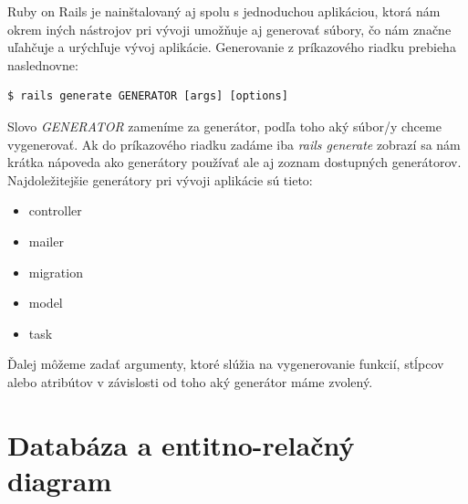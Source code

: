 Ruby on Rails je nainštalovaný aj spolu s jednoduchou aplikáciou, ktorá nám okrem iných nástrojov pri vývoji umožňuje aj generovať súbory, čo nám značne uľahčuje a urýchľuje vývoj aplikácie. Generovanie z príkazového riadku prebieha naslednovne:

\begin{verbatim}
$ rails generate GENERATOR [args] [options]
\end{verbatim}

Slovo \emph{GENERATOR} zameníme za generátor, podľa toho aký súbor/y chceme vygenerovať. Ak do príkazového riadku zadáme iba \emph{rails generate} zobrazí sa nám krátka nápoveda ako generátory používať ale aj zoznam dostupných generátorov. Najdoležitejšie generátory pri vývoji aplikácie sú tieto:

\begin{itemize}
  \item controller
  \item mailer
  \item migration
  \item model
  \item task
\end{itemize}

Ďalej môžeme zadať argumenty, ktoré slúžia na vygenerovanie funkcií, stĺpcov alebo atribútov v závislosti od toho aký generátor máme zvolený.



\clearpage
\section{Databáza a entitno-relačný diagram}


